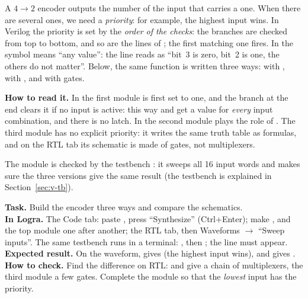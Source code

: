 A $4\to2$ encoder outputs the number of the input that carries a one. When
there are several ones, we need a \emph{priority}: for example, the highest
input wins. In Verilog the priority is set by the \emph{order of the checks}:
the  branches are checked from top to bottom, and so are the
lines of ; the first matching one fires. In  the
symbol  means ``any value'': the line  reads as ``bit~3
is zero, bit~2 is one, the others do not matter''. Below, the same function is
written three ways: with , with , and with gates.


\textbf{How to read it.} In the first module  is first set to one,
and the  branch at the end clears it if no input is active: this
way  and  get a value for \emph{every} input combination,
and there is no latch. In the second module  plays the role of
. The third module has no explicit priority: it writes the same
truth table as formulas, and on the RTL tab its schematic is made of gates, not
multiplexers.

The module is checked by the testbench : it sweeps all 16
input words and makes sure the three versions give the same result (the
testbench is explained in Section~\ref{sec:v-tb}).


\begin{diybox}
\textbf{Task.} Build the encoder three ways and compare the schematics.\\
\textbf{In Logra.} The Code tab: paste , press ``Synthesize''
(Ctrl+Enter); make ,  and 
the top module one after another; the RTL tab, then Waveforms $\to$ ``Sweep
inputs''. The same testbench runs in a terminal:
, then ; the line
 must appear.\\
\textbf{Expected result.} On the waveform,  gives 
(the highest input wins), and  gives .\\
\textbf{How to check.} Find the difference on RTL:  and 
give a chain of multiplexers, the third module a few gates.
 Complete the module so that the \emph{lowest} input has the priority.
\end{diybox}

